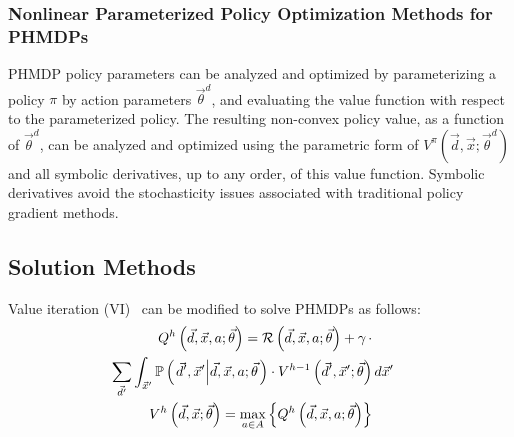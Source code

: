 \subsubsection{Nonlinear Parameterized Policy Optimization Methods for PHMDPs}

PHMDP policy parameters can be analyzed and optimized by parameterizing a policy {\footnotesize $\pi$} by action parameters {\footnotesize $\vec{\theta}^{d}$}, and evaluating the value function with respect to the parameterized policy. The resulting non-convex policy value, as a function of {\footnotesize $\vec{\theta}^{d}$}, can be analyzed and optimized using the parametric form of {\footnotesize $V^{\pi}(\vec{d}, \vec{x}; \vec{\theta}^{d})$} and all symbolic derivatives, up to any order, of this value function. Symbolic derivatives avoid the stochasticity issues associated with traditional policy gradient methods.

\subsection{Solution Methods}
Value iteration (VI)~\parencite{Bellman_PU_1957} can be modified to solve PHMDPs as follows:
{\footnotesize 
    \abovedisplayskip=0pt
    \belowdisplayskip=0pt
    \begin{align}
        Q^{h} \left( \vec{d}, \vec{x}, a; \vec{\theta} \right) = \mathcal{R} \left( \vec{d}, \vec{x}, a; \vec{\theta} \right) + \gamma \, \cdot &  \nonumber \\ 
        \sum_{\vec{d}'} \int_{\vec{x}'} \mathbb{P}\left({\left. \vec{d}', \vec{x}' \middle| \vec{d}, \vec{x}, a; \vec{\theta} \right.}\right) \cdot V^{h-1}\left( \vec{d}', \vec{x}'; \vec{\theta} \right) & \, d\vec{x}'  \label{eq:vi_qfunc} \quad \\
        V^{h}\left( \vec{d}, \vec{x}; \vec{\theta} \right) = \max_{a \in A} \left\{ Q^{h}\left( \vec{d}, \vec{x}, a; \vec{\theta} \right) \right\} & \label{eq:vi_vfunc}
    \end{align}
}%

